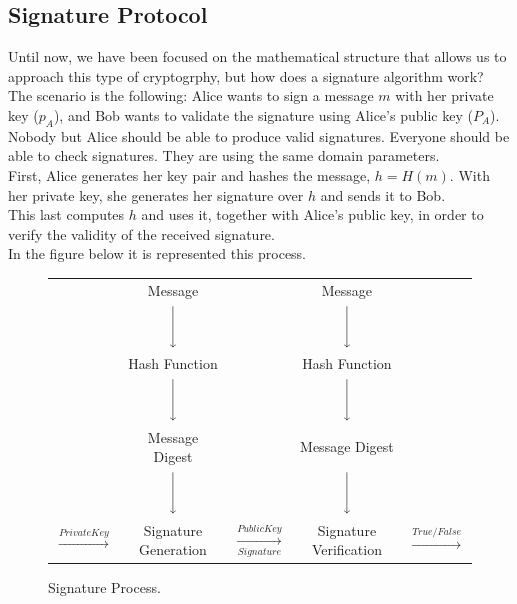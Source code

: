 \subsection{Signature Protocol}
Until now, we have been focused on the mathematical structure that allows us to approach this type of cryptogrphy, but how does a signature algorithm work?\\
The scenario is the following: Alice wants to sign a message $m$ with her private key ($p_{A}$), and Bob wants to validate the signature using Alice's public key ($P_{A}$). Nobody but Alice should be able to produce valid signatures. Everyone should be able to check signatures. They are using the same domain parameters.\\
First, Alice generates her key pair and hashes the message, $h=H(m)$. With her private key, she generates her signature over $h$ and sends it to Bob.\\
This last computes $h$ and uses it, together with Alice's public key, in order to verify the validity of the received signature.\\
In the figure below it is represented this process.\\

\begin{figure}[H]
	\centering
	\renewcommand{\arraystretch}{2}
	\begin{tabular}{ccccc}
		\cline{2-2}\cline{4-4}
		 & \multicolumn{1}{|c|}{Message} &  &
		\multicolumn{1}{|c|}{Message}& \\
		\cline{2-2}\cline{4-4}
		 & $\Bigg\downarrow$ & & $\Bigg\downarrow$& \\
		\cline{2-2}\cline{4-4}
		 & \multicolumn{1}{|c|}{Hash Function} &  &
		\multicolumn{1}{|c|}{Hash Function}& \\
		\cline{2-2}\cline{4-4}
		 & $\Bigg\downarrow$ & & $\Bigg\downarrow$& \\
		\cline{2-2}\cline{4-4}
		 & \multicolumn{1}{|c|}{Message Digest} &  &
		\multicolumn{1}{|c|}{Message Digest}& \\
		\cline{2-2}\cline{4-4}
		 & $\Bigg\downarrow$ & & $\Bigg\downarrow$& \\
		\cline{2-2}\cline{4-4}
		$\xrightarrow{Private Key}$ & \multicolumn{1}{|c|}{Signature Generation} & $\xrightarrow[Signature]{Public Key}$&
		\multicolumn{1}{|c|}{Signature Verification}& $\xrightarrow{True/False}$\\
		\cline{2-2}\cline{4-4}
	\end{tabular}
\caption{Signature Process.}
\label{SigProt}
\end{figure}
